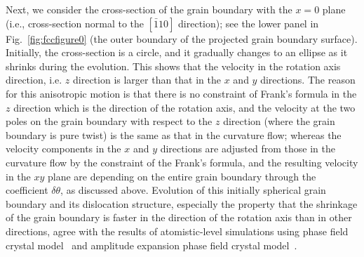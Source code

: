 Next, we consider the cross-section of the grain boundary with the $x=0$ plane (i.e., cross-section normal to the $[\bar{1}10]$ direction); see the lower panel in Fig.~\ref{fig:fccfigure0} (the outer boundary of the projected grain boundary surface).
Initially, the cross-section is a circle, and  it gradually changes to an ellipse as it shrinks during the evolution. This shows that the velocity in the rotation axis direction,  i.e. $z$ direction is larger than that in the $x$ and $y$ directions.
 The reason for this anisotropic motion is that there is no constraint of Frank's formula in the $z$ direction which is the direction of the rotation axis, and the velocity at the  two poles on the grain boundary with respect to the $z$ direction (where the grain boundary is pure twist) is the same as that in the curvature flow; whereas the velocity components in the $x$ and $y$ directions are adjusted from those in the curvature flow by the constraint of the Frank's formula, and the resulting velocity in the $xy$ plane are depending on the entire grain boundary through the coefficient $\delta \theta$, as discussed above.
 Evolution of this initially spherical grain boundary and its dislocation structure, especially the property that the shrinkage of the grain boundary is faster in the direction of the rotation axis than in other directions, agree with the results of atomistic-level simulations using phase field crystal model~\cite{yamanaka2017phase} and amplitude expansion phase field crystal model~\cite{salvalaglio2018defects}.





